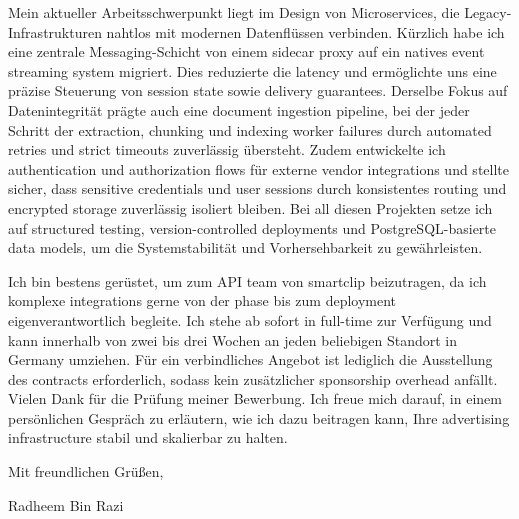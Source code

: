 \documentclass[11pt,a4paper]{coverletter}
\begin{document}
Mein aktueller Arbeitsschwerpunkt liegt im Design von Microservices, die Legacy-Infrastrukturen nahtlos mit modernen Datenflüssen verbinden. Kürzlich habe ich eine zentrale Messaging-Schicht von einem sidecar proxy auf ein natives event streaming system migriert. Dies reduzierte die latency und ermöglichte uns eine präzise Steuerung von session state sowie delivery guarantees. Derselbe Fokus auf Datenintegrität prägte auch eine document ingestion pipeline, bei der jeder Schritt der extraction, chunking und indexing worker failures durch automated retries und strict timeouts zuverlässig übersteht. Zudem entwickelte ich authentication und authorization flows für externe vendor integrations und stellte sicher, dass sensitive credentials und user sessions durch konsistentes routing und encrypted storage zuverlässig isoliert bleiben. Bei all diesen Projekten setze ich auf structured testing, version-controlled deployments und PostgreSQL-basierte data models, um die Systemstabilität und Vorhersehbarkeit zu gewährleisten.

Ich bin bestens gerüstet, um zum API team von smartclip beizutragen, da ich komplexe integrations gerne von der phase bis zum deployment eigenverantwortlich begleite. Ich stehe ab sofort in full-time zur Verfügung und kann innerhalb von zwei bis drei Wochen an jeden beliebigen Standort in Germany umziehen. Für ein verbindliches Angebot ist lediglich die Ausstellung des contracts erforderlich, sodass kein zusätzlicher sponsorship overhead anfällt. Vielen Dank für die Prüfung meiner Bewerbung. Ich freue mich darauf, in einem persönlichen Gespräch zu erläutern, wie ich dazu beitragen kann, Ihre advertising infrastructure stabil und skalierbar zu halten.

\closing{Mit freundlichen Grüßen,}{Radheem Bin Razi}
\end{document}
